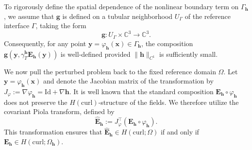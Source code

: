 \documentclass[10pt,a4paper]{amsart}
\numberwithin{equation}{section}
\begin{document}
To rigorously define the spatial dependence of the nonlinear boundary term on $\Gamma_{\mathbf{h}}$, we assume that $\mathbf{g}$ is defined on a tubular neighborhood $U_\Gamma$ of the reference interface $\Gamma$, taking the form
\[
\mathbf{g} : U_\Gamma \times \mathbb{C}^3 \to \mathbb{C}^3.
\]
Consequently, for any point $\boldsymbol{y} = \varphi_{\mathbf{h}}(\boldsymbol{x}) \in \Gamma_{\mathbf{h}}$, the composition $\mathbf{g}(\boldsymbol{y}, \gamma_T^{\mathbf{h}}\mathbf{E}_{\mathbf{h}}(\boldsymbol{y}))$ is well-defined provided $\|\mathbf{h}\|_{C^1}$ is sufficiently small.

We now pull the perturbed problem back to the fixed reference domain $\Omega$. Let $\boldsymbol{y} = \varphi_{\mathbf{h}}(\boldsymbol{x})$ and denote the Jacobian matrix of the transformation by $J_{\varphi} := \nabla \varphi_{\mathbf{h}} = \mathrm{Id} + \nabla \mathbf{h}$. It is well known that the standard composition $\mathbf{E}_{\mathbf{h}} \circ \varphi_{\mathbf{h}}$ does not preserve the $H(\mathrm{curl})$-structure of the fields. We therefore utilize the covariant Piola transform, defined by
\begin{equation}\label{eq:piola_transform}
\hat{\mathbf{E}}_{\mathbf{h}} := J_{\varphi}^{\top} (\mathbf{E}_{\mathbf{h}} \circ \varphi_{\mathbf{h}}).
\end{equation}
This transformation ensures that $\hat{\mathbf{E}}_{\mathbf{h}} \in H(\mathrm{curl}; \Omega)$ if and only if $\mathbf{E}_{\mathbf{h}} \in H(\mathrm{curl}; \Omega_{\mathbf{h}})$.
\end{document}

